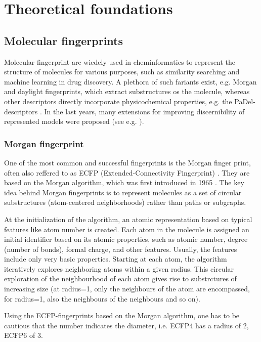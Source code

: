 \chapter{Theoretical foundations}




\section{Molecular fingerprints}

Molecular fingerprint are wiedely used in cheminformatics to represent the structure of molecules for various purposes, such as similarity searching and machine learning in drug discovery.
A plethora of such fariants exist, e.g. Morgan and daylight fingerprints, which extract substructures os the molecule, whereas other descriptors directly incorporate physicochemical properties, e.g. the PaDel-descriptors \cite{Yap.2011}. In the last years, many extensions for improving discernibility of represented models were proposed (see e.g. \cite{Capecchi.2020}).

\subsection{Morgan fingerprint}

One of the most common and successful fingerprints is the Morgan finger print, often also reffered to as ECFP (Extended-Connectivity Fingerprint) \cite{Rogers.2010}.
They are based on the Morgan algorithm, which was first introduced in 1965 \cite{Morgan.1965}. The key idea behind Morgan fingerprints is to represent molecules as a set of circular substructures (atom-centered neighborhoods) rather than paths or subgraphs. 

At the initialization of the algorithm, an atomic representation based on typical features like atom number is created. Each atom in the molecule is assigned an initial identifier based on its atomic properties, such as atomic number, degree (number of bonds), formal charge, and other features. Usually, the features include only very basic properties. Starting at each atom, the algorithm iteratively explores neighboring atoms within a given radius. This circular exploration of the neighbourhood of each atom gives rise to substrctures of increasing size (at radius=1, only the neighbours of the atom are encompassed, for radius=1, also the neighbours of the neighbours and so on).

Using the ECFP-fingerprints based on the Morgan algorithm, one has to be cautious that the number indicates the diameter, i.e. ECFP4 has a radius of 2, ECFP6 of 3.

